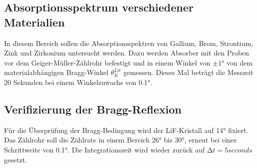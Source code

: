 \subsection{Absorptionsspektrum verschiedener Materialien}
In diesem Bereich sollen die Absorptionsspektren von Gallium, Brom, Strontium, 
Zink und Zirkonium untersucht werden. Dazu werden Absorber mit den Proben 
vor dem Geiger-Müller-Zählrohr befestigt und in einem Winkel von $\pm 1°$ von 
dem materialabhängigen Bragg-Winkel $\theta_K^{Lit}$ gemessen. Dieses Mal 
beträgt die Messzeit 20 Sekunden bei einem Winkelzuwachs von 0.1°.

\subsection{Verifizierung der Bragg-Reflexion}
Für die Überprüfung der Bragg-Bedingung wird der LiF-Kristall auf 14° fixiert.
Das Zählrohr soll die Zählrate in einem Bereich 26° bis 30°, erneut bei einer 
Schrittweite von 0.1°. Die Integrationszeit wird wieder zurück auf 
$\increment t = 5 \unit{seconds}$ gesetzt.